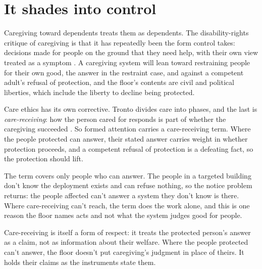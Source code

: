 \section{It shades into control}
\label{sec:21.6}
Caregiving toward dependents treats them as dependents. The disability-rights critique of caregiving is that it has repeatedly been the form control takes: decisions made for people on the ground that they need help, with their own view treated as a symptom \autocite{shakespeare2000help}. A caregiving system will lean toward restraining people for their own good, the answer in the restraint case, and against a competent adult's refusal of protection, and the floor's contents are civil and political liberties, which include the liberty to decline being protected.

Care ethics has its own corrective. Tronto divides care into phases, and the last is \emph{care-receiving}: how the person cared for responds is part of whether the caregiving succeeded \autocite{tronto1993moral}. So formed attention carries a care-receiving term. Where the people protected can answer, their stated answer carries weight in whether protection proceeds, and a competent refusal of protection is a defeating fact, so the protection should lift.

The term covers only people who can answer. The people in a targeted building don't know the deployment exists and can refuse nothing, so the notice problem returns: the people affected can't answer a system they don't know is there. Where care-receiving can't reach, the term does the work alone, and this is one reason the floor names acts and not what the system judges good for people.

Care-receiving is itself a form of respect: it treats the protected person's answer as a claim, not as information about their welfare. Where the people protected can't answer, the floor doesn't put caregiving's judgment in place of theirs. It holds their claims as the instruments state them.
